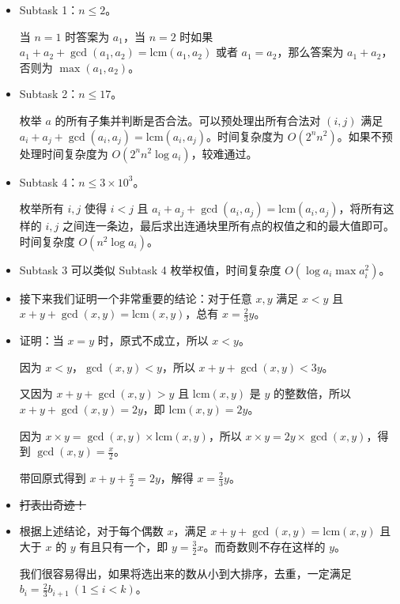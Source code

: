 \documentclass[10pt,aspectratio=43,mathserif]{beamer}
\begin{document}
\begin{frame}

	\begin{itemize} \setlength{\parskip}{0.4\baselineskip}

		\item Subtask 1：$n\leq 2$。

		当 $n=1$ 时答案为 $a_1$，当 $n=2$ 时如果 $a_1+a_2+\gcd(a_1,a_2)=\mathrm{lcm}(a_1,a_2)$ 或者 $a_1=a_2$，那么答案为 $a_1+a_2$，否则为 $\max(a_1,a_2)$。

		\item Subtask 2：$n\leq 17$。

		枚举 $a$ 的所有子集并判断是否合法。可以预处理出所有合法对 $(i,j)$ 满足 $a_i+a_j+\gcd(a_i,a_j)=\mathrm{lcm}(a_i,a_j)$。时间复杂度为 $O(2^nn^2)$。如果不预处理时间复杂度为 $O(2^nn^2\log a_i)$，较难通过。
	
		\item Subtask 4：$n\leq 3\times 10^3$。

		枚举所有 $i,j$ 使得 $i<j$ 且 $a_i+a_j+\gcd(a_i,a_j)=\mathrm{lcm}(a_i,a_j)$，将所有这样的 $i,j$ 之间连一条边，最后求出连通块里所有点的权值之和的最大值即可。时间复杂度 $O(n^2\log a_i)$。

		\item Subtask 3 可以类似 Subtask 4 枚举权值，时间复杂度 $O(\log a_i\max a_i^2)$。

	\end{itemize}

\end{frame}

\begin{frame}

	\begin{itemize} \setlength{\parskip}{0.4\baselineskip}

		\item 接下来我们证明一个非常重要的结论：对于任意 $x,y$ 满足 $x<y$ 且 $x+y+\gcd(x,y)=\mathrm{lcm}(x,y)$，总有 $x=\frac{2}{3}y$。 

		\item 证明：当 $x=y$ 时，原式不成立，所以 $x<y$。

		因为 $x<y$，$\gcd(x,y)<y$，所以 $x+y+\gcd(x,y)<3y$。

		又因为 $x+y+\gcd(x,y)>y$ 且 $\mathrm{lcm}(x,y)$ 是 $y$ 的整数倍，所以 $x+y+\gcd(x,y)=2y$，即 $\mathrm{lcm}(x,y)=2y$。

		因为 $x\times y=\gcd(x,y)\times \mathrm{lcm}(x,y)$，所以 $x\times y=2y\times \gcd(x,y)$，得到 $\gcd(x,y)=\frac{x}{2}$。

		带回原式得到 $x+y+\frac{x}{2}=2y$，解得 $x=\frac{2}{3}y$。

		\item \sout{打表出奇迹！}

		\item 根据上述结论，对于每个偶数 $x$，满足 $x+y+\gcd(x,y)=\mathrm{lcm}(x,y)$ 且大于 $x$ 的 $y$ 有且只有一个，即 $y=\frac{3}{2}x$。而奇数则不存在这样的 $y$。

		我们很容易得出，如果将选出来的数从小到大排序，去重，一定满足 $b_i=\frac{2}{3}b_{i+1}\ (1\leq i<k)$。

	\end{itemize}

\end{frame}
\end{document}
